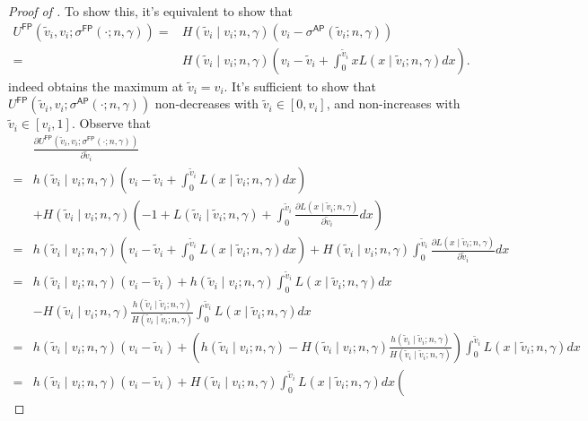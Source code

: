 \begin{proof}[Proof of ]
\noindent To show this, it's equivalent to show that
\begin{align*}
    U^{\mathsf{FP}}(\tilde{v}_i,v_i;\sigma^{\mathsf{FP}}(\cdot;n,\gamma))= & H(\tilde{v}_i\mid v_i; n, \gamma)  \left( v_i - \sigma^{\mathsf{AP}}(\tilde{v}_i;n, \gamma)\right)\\
    = & H(\tilde{v}_i\mid v_i; n, \gamma)\left( v_i - \tilde{v}_i + \int_0^{\tilde{v}_i} x L(x\mid \tilde{v}_i;n, \gamma)dx\right).
\end{align*}
indeed obtains the maximum at $\tilde{v}_i = v_i$. It's sufficient to show that $U^{\mathsf{FP}}(\tilde{v}_i,v_i;\sigma^{\mathsf{AP}}(\cdot;n,\gamma))$ non-decreases with $\tilde{v}_i \in [0, v_i]$, and non-increases with $\tilde{v}_i \in [v_i, 1]$.
Observe that
\begin{align*}
&\frac{\partial U^{\mathsf{FP}}(\tilde{v}_i,v_i;\sigma^{\mathsf{FP}}(\cdot;n,\gamma))}{\partial \tilde{v}_i} \\ = & h(\tilde{v}_i\mid v_i;n,\gamma)  \left(v_i - \tilde{v}_i  +\int_0^{\tilde{v}_i}L(x\mid \tilde{v}_i;n,\gamma)dx\right)\\
 &+ H(\tilde{v}_i\mid v_i;n,\gamma)  \left(-1+L(\tilde{v}_i\mid \tilde{v}_i;n,\gamma)
 + \int_{0}^{\tilde{v}_i}\frac{\partial L(x\mid \tilde{v}_i;n,\gamma)}{\partial \tilde{v}_i}dx
 \right)
 \\
=&  h(\tilde{v}_i\mid v_i;n,\gamma)  \left(v_i - \tilde{v}_i  +\int_0^{\tilde{v}_i}L(x\mid \tilde{v}_i;n,\gamma)dx\right)
 + H(\tilde{v}_i\mid v_i;n,\gamma)   \int_{0}^{\tilde{v}_i}\frac{\partial L(x\mid \tilde{v}_i;n,\gamma)}{\partial \tilde{v}_i}dx\\
 = & h(\tilde{v}_i\mid v_i;n,\gamma)  \left(v_i - \tilde{v}_i\right)
 +
  h(\tilde{v}_i\mid v_i;n,\gamma)  \int_0^{\tilde{v}_i}L(x\mid \tilde{v}_i;n,\gamma)dx\\
  &
  -  H(\tilde{v}_i\mid v_i;n,\gamma)  \frac{h(\tilde{v}_i\mid \tilde{v}_i;n,\gamma)}{H(\tilde{v}_i\mid \tilde{v}_i;n,\gamma)}  \int_0^{\tilde{v}_i}L(x\mid \tilde{v}_i;n,\gamma)dx\\
  = & h(\tilde{v}_i\mid v_i;n,\gamma)  \left(v_i - \tilde{v}_i\right)
 + 
   \left(
 h(\tilde{v}_i\mid v_i;n,\gamma)  - H(\tilde{v}_i\mid v_i;n,\gamma)  \frac{h(\tilde{v}_i\mid \tilde{v}_i;n,\gamma)}{H(\tilde{v}_i\mid \tilde{v}_i;n,\gamma)}
 \right)\int_0^{\tilde{v}_i}L(x\mid \tilde{v}_i;n,\gamma)dx\\
 =&  h(\tilde{v}_i\mid v_i;n,\gamma)  \left(v_i - \tilde{v}_i\right)
 +H(\tilde{v}_i\mid v_i;n,\gamma)  \int_0^{\tilde{v}_i}L(x\mid \tilde{v}_i;n,\gamma)dx
   \left(

\end{align*}
\end{proof}

